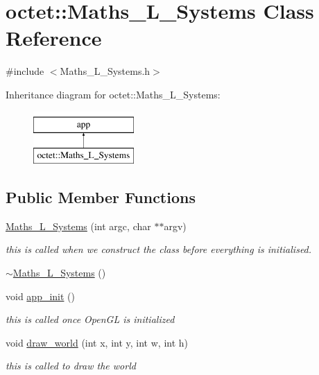 \hypertarget{classoctet_1_1_maths___l___systems}{\section{octet\+:\+:Maths\+\_\+\+L\+\_\+\+Systems Class Reference}
\label{classoctet_1_1_maths___l___systems}
}


{\ttfamily \#include $<$Maths\+\_\+\+L\+\_\+\+Systems.\+h$>$}

Inheritance diagram for octet\+:\+:Maths\+\_\+\+L\+\_\+\+Systems\+:\begin{figure}[H]
\begin{center}
\leavevmode
\includegraphics[height=2.000000cm]{classoctet_1_1_maths___l___systems}
\end{center}
\end{figure}
\subsection*{Public Member Functions}
\begin{DoxyCompactItemize}
\item 
\hyperlink{classoctet_1_1_maths___l___systems_aa121ca98ebab9c5c8907c444ae7a770d}{Maths\+\_\+\+L\+\_\+\+Systems} (int argc, char $\ast$$\ast$argv)
\begin{DoxyCompactList}\small\item\em this is called when we construct the class before everything is initialised. \end{DoxyCompactList}\item 
\hyperlink{classoctet_1_1_maths___l___systems_a4ac337cbc5e67002f2bde5b44fa50c14}{$\sim$\+Maths\+\_\+\+L\+\_\+\+Systems} ()
\item 
void \hyperlink{classoctet_1_1_maths___l___systems_a71d9012fc0fbbcd785592af8e129b338}{app\+\_\+init} ()
\begin{DoxyCompactList}\small\item\em this is called once Open\+G\+L is initialized \end{DoxyCompactList}\item 
void \hyperlink{classoctet_1_1_maths___l___systems_a8fa46e98724076f18569e49bcbc7897d}{draw\+\_\+world} (int x, int y, int w, int h)
\begin{DoxyCompactList}\small\item\em this is called to draw the world \end{DoxyCompactList}\end{DoxyCompactItemize}
